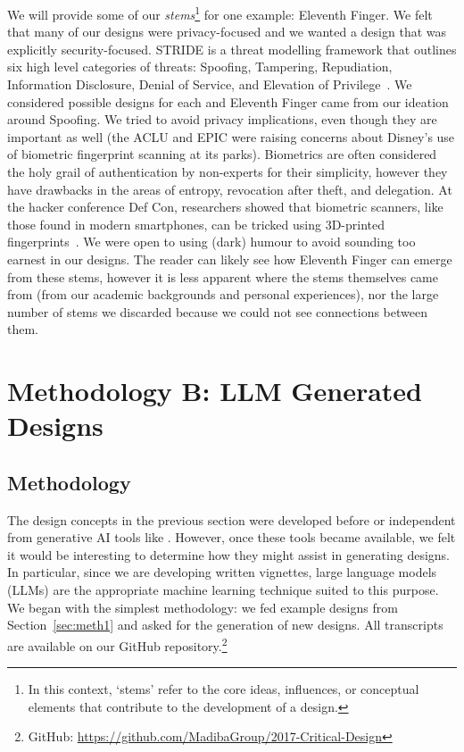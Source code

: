 We will provide some of our \textit{stems}\footnote{In this context, `stems' refer to the core ideas, influences, or conceptual elements that contribute to the development of a design.} for one example: Eleventh Finger.  We felt that many of our designs were privacy-focused and we wanted a design that was explicitly security-focused. STRIDE is a threat modelling framework that outlines six high level categories of threats: Spoofing, Tampering, Repudiation, Information Disclosure, Denial of Service, and Elevation of Privilege~\cite{shostack2014threat}. We considered possible designs for each and Eleventh Finger came from our ideation around Spoofing. We tried to avoid privacy implications, even though they are important as well (the ACLU and EPIC were raising concerns about Disney's use of biometric fingerprint scanning at its parks). Biometrics are often considered the holy grail of authentication by non-experts for their simplicity, however they have drawbacks in the areas of entropy, revocation after theft, and delegation. At the hacker conference Def Con, researchers showed that biometric scanners, like those found in modern smartphones, can be tricked using 3D-printed fingerprints~\cite{levalle2020biometric}. We were open to using (dark) humour to avoid sounding too earnest in our designs. The reader can likely see how Eleventh Finger can emerge from these stems, however it is less apparent where the stems themselves came from (\eg from our academic backgrounds and personal experiences), nor the large number of stems we discarded because we could not see connections between them. 



\section{Methodology B: LLM Generated Designs}
\label{sec:meth2}

\subsection{Methodology}

The design concepts in the previous section were developed before or independent from generative AI tools like \gpt. However, once these tools became available, we felt it would be interesting to determine how they might assist in generating designs. In particular, since we are developing written vignettes, large language models (LLMs) are the appropriate machine learning technique suited to this purpose. We began with the simplest methodology: we fed \gpt \gptv example designs from Section~\ref{sec:meth1} and asked for the generation of new designs. All transcripts are available on our GitHub repository.\footnote{GitHub: \url{https://github.com/MadibaGroup/2017-Critical-Design}}

